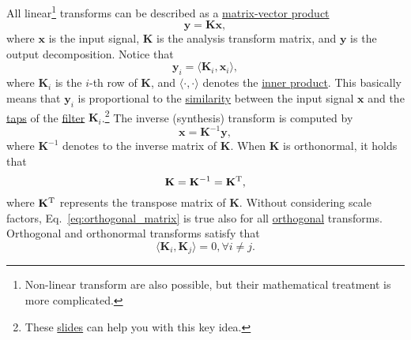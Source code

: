 All linear\footnote{Non-linear transform are also possible, but their
mathematical treatment is more complicated.}  transforms can be
described as a
\href{https://en.wikipedia.org/wiki/Matrix_multiplication}{matrix-vector
  product}~\cite{strang4linear}
\begin{equation}
  \mathbf{y} = \mathbf{K}\mathbf{x},
  \label{eq:forward_transform_matrix_form}
\end{equation}
where $\mathbf{x}$ is the input signal, $\mathbf{K}$ is the analysis
transform matrix, and $\mathbf{y}$ is the output decomposition. Notice
that
\begin{equation}
  {\mathbf{y}}_i = \langle {\mathbf{K}}_i, {\mathbf{x}}_i\rangle,
\end{equation}
where ${\mathbf{K}}_i$ is the $i$-th row of $\mathbf{K}$, and
$\langle\cdot,\cdot\rangle$ denotes the
\href{https://mathworld.wolfram.com/InnerProduct.html}{inner
  product}. This basically means that ${\mathbf{y}}_i$ is proportional to the
\href{https://en.wikipedia.org/wiki/Similarity_(geometry)}{similarity}
between the input signal $\mathbf{x}$ and the
\href{https://en.wikipedia.org/wiki/Finite_impulse_response}{taps} of
the \href{https://en.wikipedia.org/wiki/Digital_filter}{filter}
${\mathbf{K}}_i$.\footnote{These
\href{https://cseweb.ucsd.edu/classes/fa17/cse166-a/lec13.pdf}{slides}
can help you with this key idea.} The inverse (synthesis) transform is
computed by
\begin{equation}
  \mathbf{x} = {\mathbf{K}}^{-1}\mathbf{y},
  \label{eq:backward_transform_matrix_form}
\end{equation}
where ${\mathbf{K}}^{-1}$ denotes to the inverse matrix of
$\mathbf{K}$. When ${\mathbf K}$ is orthonormal, it holds that
\begin{equation}
  \mathbf{K}={\mathbf{K}}^{-1}={\mathbf{K}}^{\text T},
  \label{eq:orthogonal_matrix}
\end{equation}
where ${\mathbf{K}}^{\text T}$ represents the transpose matrix of
$\mathbf{K}$. Without considering scale factors,
Eq.~\ref{eq:orthogonal_matrix} is true also for all
\href{https://en.wikipedia.org/wiki/Orthogonality}{orthogonal}
transforms. Orthogonal and orthonormal transforms satisfy that
\begin{equation}
  \langle {\mathbf{K}}_i, {\mathbf{K}}_j\rangle = 0, \forall i\neq j.
\end{equation}

